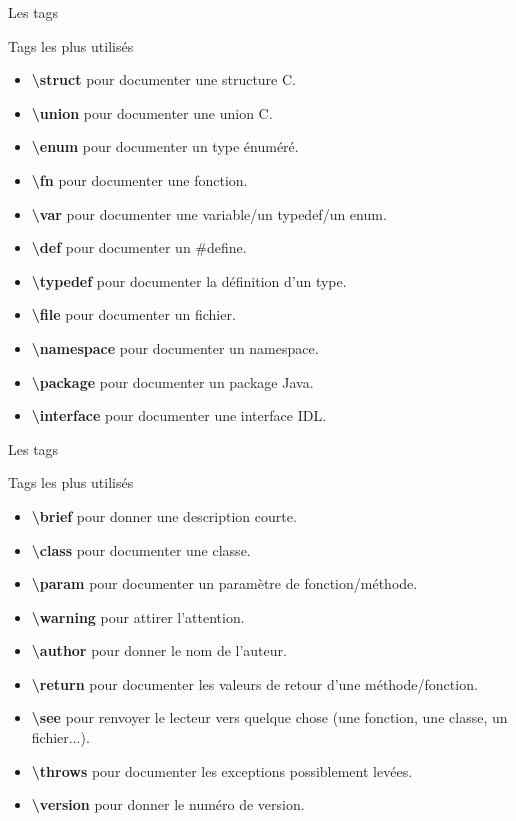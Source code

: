 \documentclass{beamer}
\begin{document}
\begin{frame}{Les tags}
\begin{block}{Tags les plus utilisés}
\begin{itemize}
\item \textbf{\textbackslash struct} pour documenter une structure C.
\item \textbf{\textbackslash union} pour documenter une union C.
\item \textbf{\textbackslash enum} pour documenter un type énuméré.
\item \textbf{\textbackslash fn} pour documenter une fonction.
\item \textbf{\textbackslash var} pour documenter une variable/un typedef/un enum.
\item \textbf{\textbackslash def} pour documenter un \#define.
\item \textbf{\textbackslash typedef} pour documenter la définition d'un type.
\item \textbf{\textbackslash file} pour documenter un fichier.
\item \textbf{\textbackslash namespace} pour documenter un namespace.
\item \textbf{\textbackslash package} pour documenter un package Java.
\item \textbf{\textbackslash interface} pour documenter une interface IDL.
\end{itemize}
\end{block}
\end{frame}

\begin{frame}{Les tags}
\begin{block}{Tags les plus utilisés}
\begin{itemize}
\item \textbf{\textbackslash brief} pour donner une description courte.
\item \textbf{\textbackslash class} pour documenter une classe.
\item \textbf{\textbackslash param} pour documenter un paramètre de fonction/méthode.
\item \textbf{\textbackslash warning} pour attirer l'attention.
\item \textbf{\textbackslash author} pour donner le nom de l'auteur.
\item \textbf{\textbackslash return} pour documenter les valeurs de retour d'une méthode/fonction.
\item \textbf{\textbackslash see} pour renvoyer le lecteur vers quelque chose (une fonction, une classe, un fichier...).
\item \textbf{\textbackslash throws} pour documenter les exceptions possiblement levées.
\item \textbf{\textbackslash version} pour donner le numéro de version.
\end{itemize}
\end{block}
\end{frame}
\end{document}
